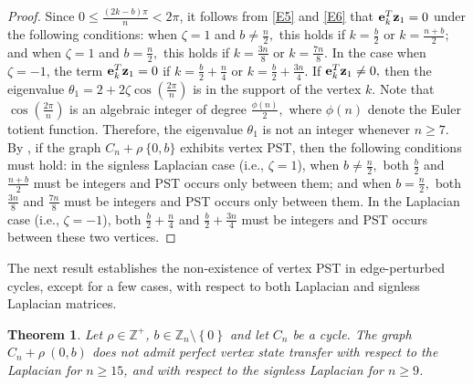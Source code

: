 \documentclass[12pt,a4paper]{article}
\newtheorem{thm}{Theorem}
\def \e {{\mathbf e}}
\def \z {{\bf z}}
\newcommand{\ob}[1]{\left(#1\right)}
\newcommand{\cb}[1]{\left\lbrace #1\right\rbrace}
\begin{document}
\begin{proof}
Since $0 \leq \frac{(2k - b)\pi}{n} < 2\pi$, it follows from \eqref{E5} and \eqref{E6} that $\e_k^T \z_1 = 0$ under the following conditions: when $\zeta = 1$ and $b \neq \frac{n}{2},$ this holds if $k = \frac{b}{2}$ or $k = \frac{n + b}{2}$; and when $\zeta = 1$ and $b = \frac{n}{2},$ this holds if $k=\frac{3n}{8}$ or $k=\frac{7n}{8}.$ In the case when $\zeta = -1$, the term $\e_k^T \z_1=0$ if $k = \frac{b}{2} + \frac{n}{4}$ or $k = \frac{b}{2} + \frac{3n}{4}$. If $\e_k^T \z_1 \neq 0,$ then the eigenvalue $\theta_1= 2+2\zeta \cos \ob{\frac{2\pi}{n}}$ is in the support of the vertex $k.$ Note that $\cos\ob{\frac{2\pi}{n}}$ is an algebraic integer of degree $\frac{\phi(n)}{2},$ where $\phi(n)$ denote the Euler totient function. Therefore, the eigenvalue $\theta_1$ is not an integer whenever $n \geq 7.$ By \cite[Theorem 4]{kirk4}, if the graph $C_n + \rho~\{0, b\}$ exhibits vertex PST, then the following conditions must hold: in the signless Laplacian case (i.e., $\zeta = 1$), when $b \neq \frac{n}{2},$ both $\frac{b}{2}$ and $\frac{n + b}{2}$ must be integers and PST occurs only between them; and when $b = \frac{n}{2},$ both $\frac{3n}{8}$ and $\frac{7n}{8}$ must be integers and PST occurs only between them. In the Laplacian case (i.e., $\zeta = -1$), both $\frac{b}{2} + \frac{n}{4}$ and $\frac{b}{2} + \frac{3n}{4}$ must be integers and PST occurs between these two vertices.
\end{proof}
The next result establishes the non-existence of vertex PST in edge-perturbed cycles, except for a few cases, with respect to both Laplacian and signless Laplacian matrices.
\begin{thm}\label{T4}
Let $\rho \in \mathbb{Z}^+$, $b \in \mathbb{Z}_n\setminus \cb{0}$ and let $C_n$ be a cycle. The graph $C_n + \rho~(0,b)$
does not admit perfect vertex state transfer with respect to the Laplacian
for $n \geq 15$, and with respect to the signless Laplacian for $n \geq 9$.
\end{thm}
\end{document}
